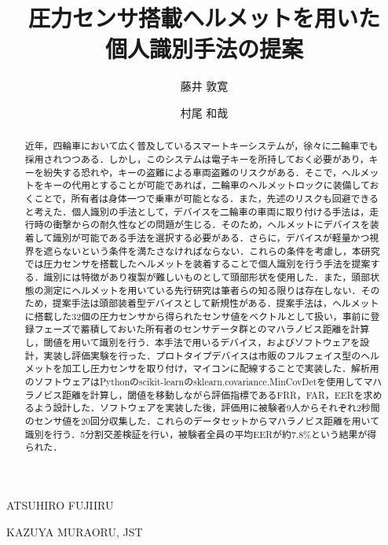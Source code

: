 \documentclass[Japanese,noauthor]{dicomopapers}
\begin{document}
\title{圧力センサ搭載ヘルメットを用いた\\個人識別手法の提案}


\author{藤井 敦寛}{ATSUHIRO FUJII}{RU}
\author{村尾 和哉}{KAZUYA MURAO}{RU, JST}

\begin{abstract}
近年，四輪車において広く普及しているスマートキーシステムが，徐々に二輪車でも採用されつつある．しかし，このシステムは電子キーを所持しておく必要があり，キーを紛失する恐れや，キーの盗難による車両盗難のリスクがある．そこで，ヘルメットをキーの代用とすることが可能であれば，二輪車のヘルメットロックに装備しておくことで，所有者は身体一つで乗車が可能となる．また，先述のリスクも回避できると考えた．個人識別の手法として，デバイスを二輪車の車両に取り付ける手法は，走行時の衝撃からの耐久性などの問題が生じる．そのため，ヘルメットにデバイスを装着して識別が可能である手法を選択する必要がある．さらに，デバイスが軽量かつ視界を遮らないという条件を満たさなければならない．これらの条件を考慮し，本研究では圧力センサを搭載したヘルメットを装着することで個人識別を行う手法を提案する．識別には特徴があり複製が難しいものとして頭部形状を使用した．また，頭部状態の測定にヘルメットを用いている先行研究は筆者らの知る限りは存在しない．そのため，提案手法は頭部装着型デバイスとして新規性がある．提案手法は，ヘルメットに搭載した32個の圧力センサから得られたセンサ値をベクトルとして扱い，事前に登録フェーズで蓄積しておいた所有者のセンサデータ群とのマハラノビス距離を計算し，閾値を用いて識別を行う．本手法で用いるデバイス，およびソフトウェアを設計，実装し評価実験を行った．プロトタイプデバイスは市販のフルフェイス型のヘルメットを加工し圧力センサを取り付け，マイコンに配線することで実装した．解析用のソフトウェアはPythonのscikit-learnのsklearn.covariance.MinCovDetを使用してマハラノビス距離を計算し，閾値を移動しながら評価指標であるFRR，FAR，EERを求めるよう設計した．ソフトウェアを実装した後，評価用に被験者9人からそれぞれ2秒間のセンサ値を20回分収集した．これらのデータセットからマハラノビス距離を用いて識別を行う．5分割交差検証を行い，被験者全員の平均EERが約7.8\%という結果が得られた．
\end{abstract}

\maketitle

\end{document}
